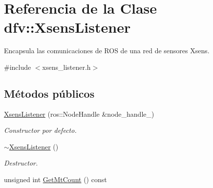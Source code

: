 \hypertarget{classdfv_1_1XsensListener}{\section{\-Referencia de la \-Clase dfv\-:\-:\-Xsens\-Listener}
\label{classdfv_1_1XsensListener}
}


\-Encapsula las comunicaciones de \-R\-O\-S de una red de sensores \-Xsens.  




{\ttfamily \#include $<$xsens\-\_\-listener.\-h$>$}

\subsection*{\-Métodos públicos}
\begin{DoxyCompactItemize}
\item 
\hyperlink{classdfv_1_1XsensListener_a545d4b10d2c34166d82bc41403e39a00}{\-Xsens\-Listener} (ros\-::\-Node\-Handle \&node\-\_\-handle\-\_\-)
\begin{DoxyCompactList}\small\item\em \-Constructor por defecto. \end{DoxyCompactList}\item 
\hypertarget{classdfv_1_1XsensListener_abe379af82320a08aa76f0741a7f11db0}{\hyperlink{classdfv_1_1XsensListener_abe379af82320a08aa76f0741a7f11db0}{$\sim$\-Xsens\-Listener} ()}\label{classdfv_1_1XsensListener_abe379af82320a08aa76f0741a7f11db0}

\begin{DoxyCompactList}\small\item\em \-Destructor. \end{DoxyCompactList}\item 
\hypertarget{classdfv_1_1XsensListener_a5d31c2bd34dcbd18c60634e994c02ed3}{unsigned int \hyperlink{classdfv_1_1XsensListener_a5d31c2bd34dcbd18c60634e994c02ed3}{\-Get\-Mt\-Count} () const }\label{classdfv_1_1XsensListener_a5d31c2bd34dcbd18c60634e994c02ed3}


\end{DoxyCompactItemize}
